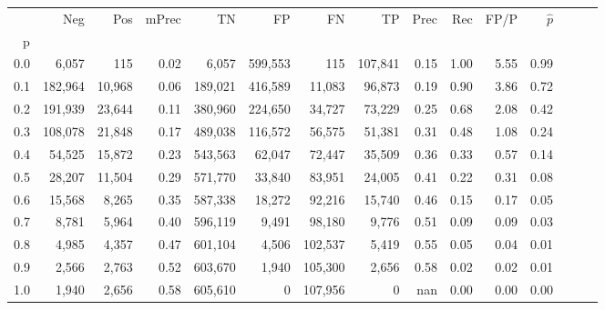 \begin{tabular}{rrrrrrrrrrrrrrr}
\toprule
{} &      Neg &     Pos & mPrec &       TN &       FP &       FN &       TP &  Prec &   Rec &  FP/P & $\hat{p}$ \\
p   &          &         &       &          &          &          &          &       &       &       &           \\
\midrule
0.0 &    6,057 &     115 &  0.02 &    6,057 &  599,553 &      115 &  107,841 &  0.15 &  1.00 &  5.55 &      0.99 \\
0.1 &  182,964 &  10,968 &  0.06 &  189,021 &  416,589 &   11,083 &   96,873 &  0.19 &  0.90 &  3.86 &      0.72 \\
0.2 &  191,939 &  23,644 &  0.11 &  380,960 &  224,650 &   34,727 &   73,229 &  0.25 &  0.68 &  2.08 &      0.42 \\
0.3 &  108,078 &  21,848 &  0.17 &  489,038 &  116,572 &   56,575 &   51,381 &  0.31 &  0.48 &  1.08 &      0.24 \\
0.4 &   54,525 &  15,872 &  0.23 &  543,563 &   62,047 &   72,447 &   35,509 &  0.36 &  0.33 &  0.57 &      0.14 \\
0.5 &   28,207 &  11,504 &  0.29 &  571,770 &   33,840 &   83,951 &   24,005 &  0.41 &  0.22 &  0.31 &      0.08 \\
0.6 &   15,568 &   8,265 &  0.35 &  587,338 &   18,272 &   92,216 &   15,740 &  0.46 &  0.15 &  0.17 &      0.05 \\
0.7 &    8,781 &   5,964 &  0.40 &  596,119 &    9,491 &   98,180 &    9,776 &  0.51 &  0.09 &  0.09 &      0.03 \\
0.8 &    4,985 &   4,357 &  0.47 &  601,104 &    4,506 &  102,537 &    5,419 &  0.55 &  0.05 &  0.04 &      0.01 \\
0.9 &    2,566 &   2,763 &  0.52 &  603,670 &    1,940 &  105,300 &    2,656 &  0.58 &  0.02 &  0.02 &      0.01 \\
1.0 &    1,940 &   2,656 &  0.58 &  605,610 &        0 &  107,956 &        0 &   nan &  0.00 &  0.00 &      0.00 \\
\bottomrule
\end{tabular}
